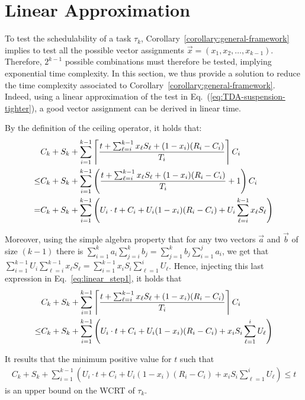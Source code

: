 \section{Linear Approximation}
\label{sec:linear-approximation}

To test the schedulability of a task $\tau_k$,
Corollary~\ref{corollary:general-framework} implies to test all the
possible vector assignments $\vec{x} = (x_1, x_2, \ldots, x_{k-1})$. Therefore, $2^{k-1}$ possible combinations must therefore be tested, implying exponential time complexity. In this section, we thus provide a solution to reduce the time complexity associated to
Corollary~\ref{corollary:general-framework}. Indeed, using a linear approximation of the test in Eq.~(\ref{eq:TDA-suspension-tighter}), a good vector assignment can be derived in linear time. 

By the definition of the ceiling operator, it holds that:
{\footnotesize \begin{align}
&C_k + S_k + \sum_{i=1}^{k-1}\ceiling{\frac{t+\sum_{\ell=i}^{k-1}x_\ell S_\ell+(1-x_i)(R_i-C_i)}{T_i}} C_i \nonumber\\
\leq& C_k + S_k  +   \sum_{i=1}^{k-1} \left(\frac{t+\sum_{\ell=i}^{k-1}x_\ell S_\ell +(1-x_i)(R_i-C_i)}{T_i} +1\right) C_i \nonumber\\
=& C_k + S_k  + \sum_{i=1}^{k-1} \left(U_i\cdot t + C_i+U_i (1-x_i)(R_i-C_i) + U_i\sum_{\ell=i}^{k-1}x_\ell S_\ell \right) \label{eq:linear_step1}
\end{align}}

Moreover, using the simple algebra property that for any two vectors $\vec{a}$ and $\vec{b}$ of size $(k-1)$ there is $\sum_{i=1}^{k} a_i \sum_{j=i}^{k} b_j = \sum_{j=1}^{k} b_j \sum_{i=1}^{j} a_i$, we get that $\sum_{i=1}^{k-1} U_i\sum_{\ell=i}^{k-1}x_\ell S_\ell = \sum_{i=1}^{k-1} x_i S_i \sum_{\ell=1}^{i}U_\ell $. Hence, injecting this last expression in Eq.~\eqref{eq:linear_step1}, it holds that
{\footnotesize
\begin{align*}
& C_k + S_k + \sum_{i=1}^{k-1}\left\lceil{\frac{t+\sum_{\ell=i}^{k-1}x_\ell S_\ell+(1-x_i)(R_i-C_i)}{T_i}}\right\rceil C_i\\
\leq & C_k + S_k + \sum_{i=1}^{k-1}  \left(U_i\cdot t + C_i + U_i (1-x_i)(R_i-C_i) + x_i S_i\sum_{\ell=1}^{i}U_\ell \right)
\end{align*}}

It results that the minimum positive value for $t$ such that
{\footnotesize\begin{align}
\label{eq:linear-approximation-upper-bound}
C_k + S_k + \sum_{i=1}^{k-1}  \left(U_i\cdot t + C_i + U_i (1-x_i)(R_i-C_i) + x_i S_i\sum_{\ell=1}^{i}U_\ell \right) \leq t
\end{align}}
is an upper bound on the WCRT of $\tau_k$.

